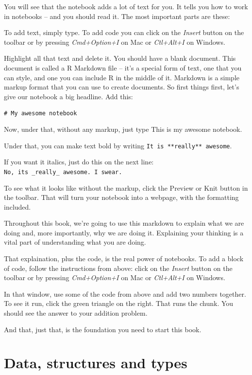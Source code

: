 \documentclass[]{book}
\begin{document}
You will see that the notebook adds a lot of text for you. It tells you how to work in notebooks -- and you should read it. The most important parts are these:

To add text, simply type. To add code you can click on the \emph{Insert} button on the toolbar or by pressing \emph{Cmd+Option+I} on Mac or \emph{Ctl+Alt+I} on Windows.

Highlight all that text and delete it. You should have a blank document. This document is called a R Markdown file -- it's a special form of text, one that you can style, and one you can include R in the middle of it. Markdown is a simple markup format that you can use to create documents. So first things first, let's give our notebook a big headline. Add this:

\texttt{\#\ My\ awesome\ notebook}

Now, under that, without any markup, just type This is my awesome notebook.

Under that, you can make text bold by writing \texttt{It\ is\ **really**\ awesome}.

If you want it italics, just do this on the next line: \texttt{No,\ it\textquotesingle{}s\ \_really\_\ awesome.\ I\ swear.}

To see what it looks like without the markup, click the Preview or Knit button in the toolbar. That will turn your notebook into a webpage, with the formatting included.

Throughout this book, we're going to use this markdown to explain what we are doing and, more importantly, why we are doing it. Explaining your thinking is a vital part of understanding what you are doing.

That explaination, plus the code, is the real power of notebooks. To add a block of code, follow the instructions from above: click on the \emph{Insert} button on the toolbar or by pressing \emph{Cmd+Option+I} on Mac or \emph{Ctl+Alt+I} on Windows.

In that window, use some of the code from above and add two numbers together. To see it run, click the green triangle on the right. That runs the chunk. You should see the answer to your addition problem.

And that, just that, is the foundation you need to start this book.

\hypertarget{data-structures-and-types}{%
\chapter{Data, structures and types}\label{data-structures-and-types}}
\end{document}
